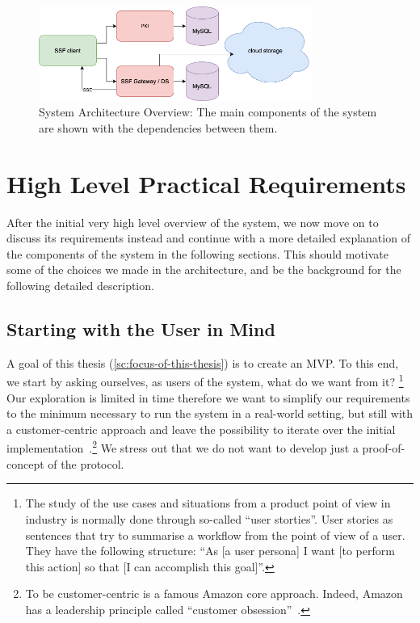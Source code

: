 \begin{figure}
    \centering
    \includegraphics[width=0.8\textwidth]{figures/architecture.png}
    \caption{System Architecture Overview: The main components of the system are shown with the dependencies between them.}
    \label{fig:architecture}
\end{figure}

\section{High Level Practical Requirements}\label{sc:requirements}

After the initial very high level overview of the system, we
now move on to discuss its requirements instead and continue with a more
detailed explanation of the components of the system in the following sections.
This should motivate some of the choices we made in the architecture,
and be the background for the following detailed description.

\subsection{Starting with the User in Mind}\label{sc:real-user}

A goal of this thesis (\cref{sc:focus-of-this-thesis})
is to create an MVP. To this end, we start by asking ourselves,
as users of the system, what do we want from it?
\footnote{The study of the use cases and situations from a product 
point of view in industry is normally done through so-called ``user storties''.
User stories as sentences that try to summarise a workflow from the
point of view of a user. They have the following structure:
``As [a user persona] I want [to perform this action] so that [I can accomplish this goal]''.}
Our exploration is limited in time therefore we want to simplify
our requirements to the minimum necessary to run the system
in a real-world setting, 
but still with a customer-centric approach
and leave the possibility to iterate over the initial implementation~\cite{ries2011startup}.\footnote{To be customer-centric is a famous Amazon core approach. Indeed, Amazon has a leadership principle called ``customer obsession''~\cite{AmazonLeadershipPrinciples}.}
We stress out that we do not want to develop just a proof-of-concept of the protocol.

